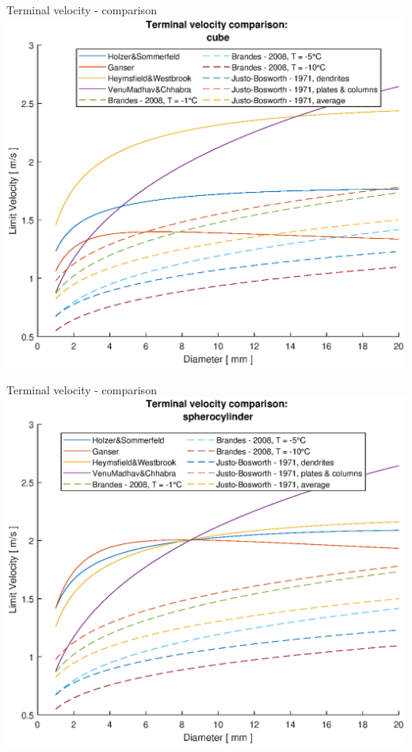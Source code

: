 \documentclass[11pt]{beamer}
\begin{document}
	\begin{frame}{Terminal velocity - comparison}
		\centering
		\includegraphics[height=\textheight,width=\textwidth,keepaspectratio] {vt_cube.eps}		
	\end{frame}

	\begin{frame}{Terminal velocity - comparison}
		\centering
		\includegraphics[height=\textheight,width=\textwidth,keepaspectratio] {vt_spherocylinder.eps}		
	\end{frame}
\end{document}
